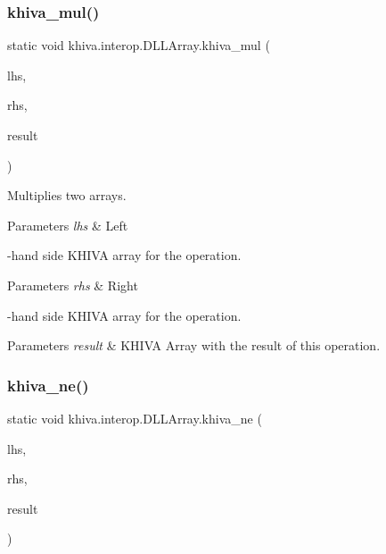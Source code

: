 \subsubsection{\texorpdfstring{khiva\+\_\+mul()}{khiva\_mul()}}
{\footnotesize\ttfamily static void khiva.\+interop.\+D\+L\+L\+Array.\+khiva\+\_\+mul (\begin{DoxyParamCaption}\item[{\mbox{[}\+In\mbox{]} ref Int\+Ptr}]{lhs,  }\item[{\mbox{[}\+In\mbox{]} ref Int\+Ptr}]{rhs,  }\item[{\mbox{[}\+Out\mbox{]} out Int\+Ptr}]{result }\end{DoxyParamCaption})\hspace{0.3cm}{\ttfamily [static]}}



Multiplies two arrays. 


\begin{DoxyParams}{Parameters}
{\em lhs} & Left\\
\hline
\end{DoxyParams}
-\/hand side K\+H\+I\+VA array for the operation. 
\begin{DoxyParams}{Parameters}
{\em rhs} & Right\\
\hline
\end{DoxyParams}
-\/hand side K\+H\+I\+VA array for the operation. 
\begin{DoxyParams}{Parameters}
{\em result} & K\+H\+I\+VA Array with the result of this operation.\\
\hline
\end{DoxyParams}
\mbox{\label{classkhiva_1_1interop_1_1_d_l_l_array_aa7036f8f9ef7dc3b5746ac74717d0452}} 
\subsubsection{\texorpdfstring{khiva\+\_\+ne()}{khiva\_ne()}}
{\footnotesize\ttfamily static void khiva.\+interop.\+D\+L\+L\+Array.\+khiva\+\_\+ne (\begin{DoxyParamCaption}\item[{\mbox{[}\+In\mbox{]} ref Int\+Ptr}]{lhs,  }\item[{\mbox{[}\+In\mbox{]} ref Int\+Ptr}]{rhs,  }\item[{\mbox{[}\+Out\mbox{]} out Int\+Ptr}]{result }\end{DoxyParamCaption})\hspace{0.3cm}{\ttfamily [static]}}



